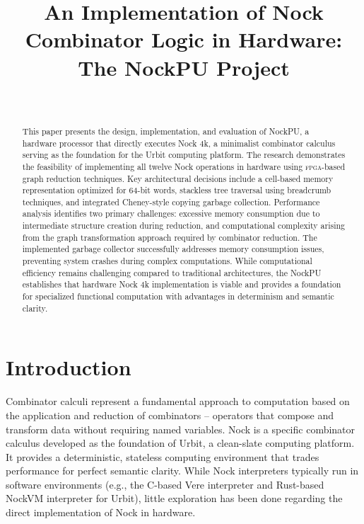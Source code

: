 \documentclass[twoside]{article}
\title{An Implementation of Nock Combinator Logic in Hardware: The NockPU Project}
\author{\authorpatp \\ \affiliation}
\date{}
\begin{document}
\maketitle
\thispagestyle{firststyle}

\begin{abstract}
\sloppy
This paper presents the design, implementation, and evaluation of NockPU, a hardware processor that directly executes Nock 4k, a minimalist combinator calculus serving as the foundation for the Urbit computing platform. The research demonstrates the feasibility of implementing all twelve Nock operations in hardware using \textsc{fpga}-based graph reduction techniques. Key architectural decisions include a cell-based memory representation optimized for 64-bit words, stackless tree traversal using breadcrumb techniques, and integrated Cheney-style copying garbage collection. Performance analysis identifies two primary challenges: excessive memory consumption due to intermediate structure creation during reduction, and computational complexity arising from the graph transformation approach required by combinator reduction. The implemented garbage collector successfully addresses memory consumption issues, preventing system crashes during complex computations. While computational efficiency remains challenging compared to traditional architectures, the NockPU establishes that hardware Nock 4k implementation is viable and provides a foundation for specialized functional computation with advantages in determinism and semantic clarity.
\end{abstract}

\setcounter{page}{99}

\tableofcontents

\section{Introduction}

Combinator calculi represent a fundamental approach to computation based on the application and reduction of combinators -- operators that compose and transform data without requiring named variables. Nock is a specific combinator calculus developed as the foundation of Urbit, a clean-slate computing platform. It provides a deterministic, stateless computing environment that trades performance for perfect semantic clarity. While Nock interpreters typically run in software environments (e.g., the C-based Vere interpreter and Rust-based NockVM interpreter for Urbit), little exploration has been done regarding the direct implementation of Nock in hardware.
\end{document}
